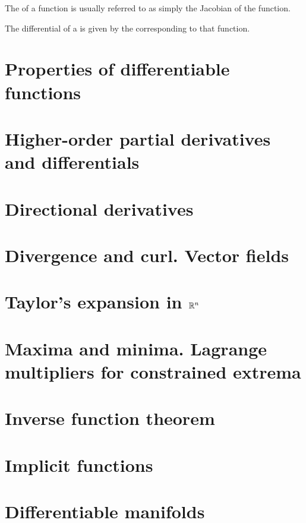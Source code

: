 \begin{note}
    The  of a function is usually referred to as simply the Jacobian of the function.
\end{note}

\begin{remark} 
    The differential of a  is given by the  corresponding to that 
    function.
\end{remark}


\section{Properties of differentiable functions}

\section{Higher-order partial derivatives and differentials}

\section{Directional derivatives}

\section{Divergence and curl. Vector fields}

\section{Taylor's expansion in $\Rtn$}

\section{Maxima and minima. Lagrange multipliers for constrained extrema}

\section{Inverse function theorem}

\section{Implicit functions}

\section{Differentiable manifolds}


